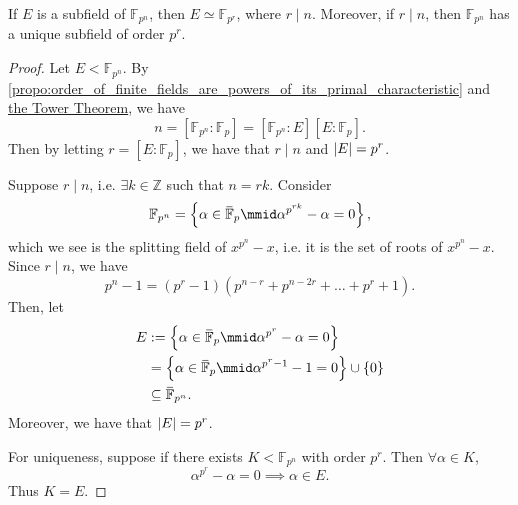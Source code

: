 \documentclass[notoc,notitlepage,nobib]{tufte-book}
\begin{document}
\begin{thm}\label{thm:subfields_of_finite_fields}
  If $E$ is a subfield of $\mathbb{F}_{p^n}$, then $E \simeq \mathbb{F}_{p^r}$,
  where $r \mid n$. Moreover, if $r \mid n$, then $\mathbb{F}_{p^n}$ has a
  unique subfield of order $p^r$.
\end{thm}

\begin{proof}
   Let $E < \mathbb{F}_{p^n}$. By
  \cref{propo:order_of_finite_fields_are_powers_of_its_primal_characteristic}
  and \hyperref[thm:tower_theorem]{the Tower Theorem}, we have
  \begin{equation*}
    n = [ \mathbb{F}_{p^n} : \mathbb{F}_p ] = [ \mathbb{F}_{p^n} : E ][ E :
    \mathbb{F}_p ].
  \end{equation*}
  Then by letting $r = [ E : \mathbb{F}_p ]$, we have that $r \mid n$ and
  $\left|E\right| = p^r$.

  \noindent
   Suppose $r \mid n$, i.e. $\exists k \in \mathbb{Z}$ such
  that $n = rk$. Consider
  \begin{equation*}
    \mathbb{F}_{p^n} = \left\{ \alpha \in \bar{\mathbb{F}}_p \mmid
    \alpha^{p^{rk}} - \alpha = 0 \right\},
  \end{equation*}
  which
  we see is the splitting field of $x^{p^n} - x$, i.e. it is the set of roots of
  $x^{p^n} - x$. Since $r \mid n$, we have
  \begin{equation*}
    p^n - 1 = (p^r - 1)(p^{n - r} + p^{n - 2r} + \hdots + p^r + 1).
  \end{equation*}
  Then, let
  \begin{align*}
    E &:= \left\{ \alpha \in \bar{\mathbb{F}}_p \mmid \alpha^{p^r} - \alpha = 0
    \right\} \\
      &= \left\{ \alpha \in \bar{\mathbb{F}}_p \mmid \alpha^{p^r - 1} - 1 = 0
      \right\} \cup \{ 0 \} \\
      &\subseteq \bar{\mathbb{F}}_{p^n}.
  \end{align*}
  Moreover, we have that $\left|E\right| = p^r$.

  For uniqueness, suppose if there exists $K < \mathbb{F}_{p^n}$ with order
  $p^r$. Then $\forall \alpha \in K$,
  \begin{equation*}
    \alpha^{p^r} - \alpha = 0 \implies \alpha \in E.
  \end{equation*}
  Thus $K = E$.
\end{proof}
\end{document}
